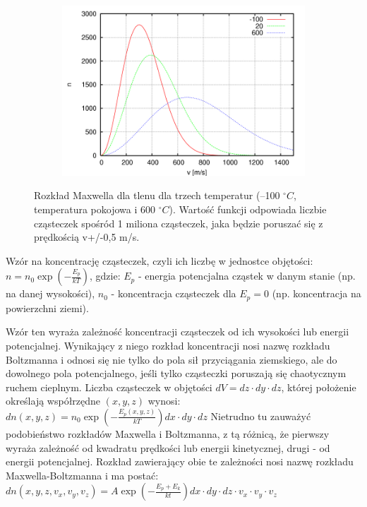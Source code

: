 \begin{figure} [H]
	\centering
	\begin{subfigure}{1.0\textwidth}
		\centering
		\includegraphics[width=0.98\linewidth]{generalIssues/Figures/maxwellDistribution.png}
	\end{subfigure}
	\caption{Rozkład Maxwella dla tlenu dla trzech temperatur (–100 $ ^\circ C $, temperatura pokojowa i 600 $ ^\circ C $). Wartość funkcji odpowiada liczbie cząsteczek spośród 1 miliona cząsteczek, jaka będzie poruszać się z prędkością v+/-0,5 m/s.}
	\label{maxwellDistribution}
\end{figure}

Wzór na koncentrację cząsteczek, czyli ich liczbę w jednostce objętości:\newline
$ n = n_0\exp(-\frac{E_p}{kT}) $, gdzie:\newline
$ E_p $ - energia potencjalna cząstek w danym stanie (np. na danej wysokości),\newline
$ n_0 $ - koncentracja cząsteczek dla $ E_p = 0 $ (np. koncentracja na powierzchni ziemi).\newline

Wzór ten wyraża zależność koncentracji cząsteczek od ich wysokości lub energii potencjalnej. Wynikający z niego rozkład koncentracji nosi nazwę rozkładu Boltzmanna i odnosi się nie tylko do pola sił przyciągania ziemskiego, ale do dowolnego pola potencjalnego, jeśli tylko cząsteczki poruszają się chaotycznym ruchem cieplnym. Liczba cząsteczek w objętości $ dV = dz \cdot dy \cdot dz $, której położenie określają współrzędne $ (x,y,z) $ wynosi:\newline
$ dn(x,y,z) = n_0\exp(-\frac{E_p(x,y,z)}{kT})dx\cdot dy\cdot dz $\newline
Nietrudno tu zauważyć podobieństwo rozkładów Maxwella i Boltzmanna, z tą różnicą, że pierwszy wyraża zależność od kwadratu prędkości lub energii kinetycznej, drugi - od energii potencjalnej. Rozkład zawierający obie te zależności nosi nazwę rozkładu Maxwella-Boltzmanna i ma postać:
$ dn(x,y,z,v_x,v_y,v_z) = A\exp(-\frac{E_p+E_k}{kt})dx\cdot dy \cdot dz \cdot v_x \cdot v_y \cdot v_z $

